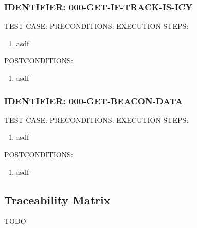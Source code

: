 \documentclass{scrreprt}
\begin{document}
\subsubsection{IDENTIFIER: 000-GET-IF-TRACK-IS-ICY}
TEST CASE:
PRECONDITIONS:
EXECUTION STEPS:
\begin{enumerate}
	\item asdf
\end{enumerate}
POSTCONDITIONS:
\begin{enumerate}
	\item asdf
\end{enumerate}

\subsubsection{IDENTIFIER: 000-GET-BEACON-DATA}
TEST CASE:
PRECONDITIONS:
EXECUTION STEPS:
\begin{enumerate}
	\item asdf
\end{enumerate}
POSTCONDITIONS:
\begin{enumerate}
	\item asdf
\end{enumerate}


\subsection{Traceability Matrix}

TODO
\end{document}
